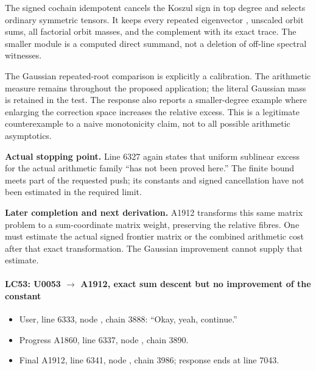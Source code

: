 The signed cochain idempotent \protect{}
cancels the Koszul sign in top degree and selects ordinary symmetric
tensors. It keeps every repeated eigenvector
\protect{}, unscaled orbit sums, all factorial orbit
masses, and the complement with its exact trace. The smaller module is a
computed direct summand, not a deletion of off-line spectral witnesses.

The Gaussian repeated-root comparison is explicitly a calibration. The
arithmetic measure remains \protect{} throughout
the proposed application; the literal Gaussian mass
\protect{} is retained in the test. The response also
reports a smaller-degree example where enlarging the correction space
increases the relative excess. This is a legitimate counterexample to a
naive monotonicity claim, not to all possible arithmetic asymptotics.

\textbf{Actual stopping point.} Line 6327 again states that uniform
sublinear excess for the actual arithmetic family ``has not been proved
here.'' The finite bound meets part of the requested push; its constants
and signed cancellation have not been estimated in the required limit.

\textbf{Later completion and next derivation.} A1912 transforms this
same matrix problem to a sum-coordinate matrix weight, preserving the
relative fibres. One must estimate the actual signed frontier matrix or
the combined arithmetic \protect{} cost after that
exact transformation. The Gaussian improvement cannot supply that
estimate.

\paragraph{\texorpdfstring{LC53: U0053
\allowbreak{}\ensuremath{→}\allowbreak{} A1912, exact sum descent but no
improvement of the
constant}{LC53: U0053  A1912, exact sum descent but no improvement of the constant}}\label{lc53-u0053-a1912-exact-sum-descent-but-no-improvement-of-the-constant}

\begin{itemize}
\tightlist
\item
  User, line 6333, node
  \protect{}, chain 3888:
  ``Okay, yeah, continue.''
\item
  Progress A1860, line 6337, node
  \protect{}, chain 3890.
\item
  Final A1912, line 6341, node
  \protect{}, chain 3986;
  response ends at line 7043.
\end{itemize}

